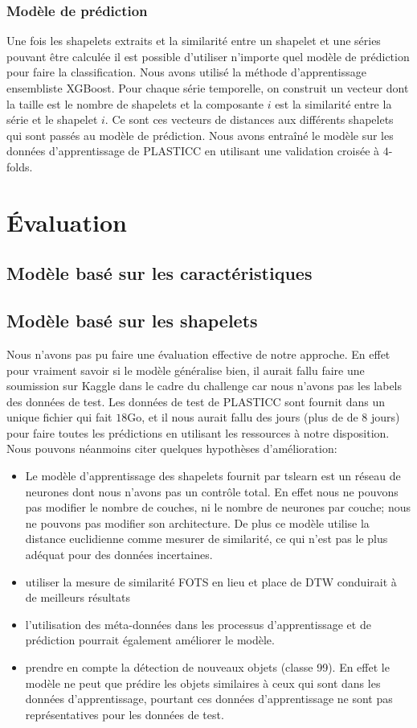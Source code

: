 \subsubsection{Modèle de prédiction}
Une fois les shapelets extraits et la similarité entre un shapelet et une séries pouvant être calculée il est possible d'utiliser n'importe quel modèle de prédiction pour faire la classification. Nous avons utilisé la méthode d'apprentissage ensembliste XGBoost\cite{chen2016xgboost}. Pour chaque série temporelle, on construit un vecteur dont la taille est le nombre de shapelets et la composante $ i $ est la similarité entre la série et le shapelet $ i $. Ce sont ces vecteurs de distances aux différents shapelets qui sont passés au modèle de prédiction. Nous avons entraîné le modèle sur les données d'apprentissage de PLASTICC en utilisant une validation croisée à $ 4 $-folds.

\section{Évaluation}
\subsection{Modèle basé sur les caractéristiques}

\subsection{Modèle basé sur les shapelets}
Nous n'avons pas pu faire une évaluation effective de notre approche. En effet pour vraiment savoir si le modèle généralise bien, il aurait fallu faire une soumission sur Kaggle dans le cadre du challenge car nous n'avons pas les labels des données de test. Les données de test de PLASTICC sont fournit dans un unique fichier qui fait $ 18$Go, et il nous aurait fallu des jours (plus de de 8 jours) pour faire toutes les prédictions en utilisant les ressources à notre disposition. Nous pouvons néanmoins citer quelques hypothèses d'amélioration:
\begin{itemize}
    \item Le modèle d'apprentissage des shapelets fournit par tslearn est un réseau de neurones dont nous n'avons pas un contrôle total. En effet nous ne pouvons pas modifier le nombre de couches, ni le nombre de neurones par couche; nous ne pouvons pas modifier son architecture. De plus ce modèle utilise la distance euclidienne comme mesurer de similarité, ce qui n'est pas le plus adéquat pour des données incertaines.
    \item utiliser la mesure de similarité FOTS en lieu et place de DTW conduirait à de meilleurs résultats
    \item l'utilisation des méta-données dans les processus d'apprentissage et de prédiction pourrait également améliorer le modèle.
    \item prendre en compte la détection de nouveaux objets (classe 99). En effet le modèle ne peut que prédire les objets similaires à ceux qui sont dans les données d'apprentissage, pourtant ces données d'apprentissage ne sont pas représentatives pour les données de test.
\end{itemize}